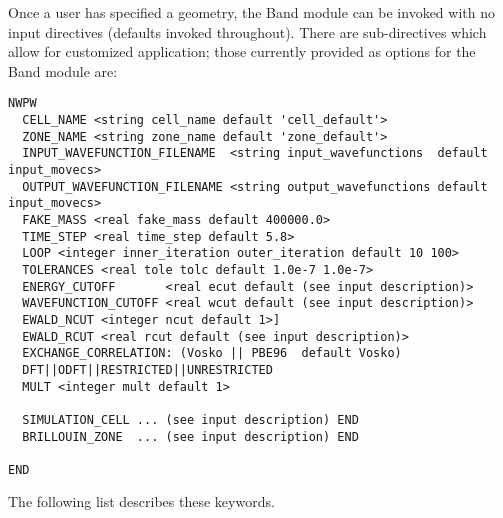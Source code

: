 Once a user has specified a geometry, the Band module can be invoked with no input directives (defaults invoked throughout).  There are sub-directives which allow for customized application; those currently provided as options for the Band module are:
\begin{verbatim}
NWPW
  CELL_NAME <string cell_name default 'cell_default'>
  ZONE_NAME <string zone_name default 'zone_default'>
  INPUT_WAVEFUNCTION_FILENAME  <string input_wavefunctions  default input_movecs>
  OUTPUT_WAVEFUNCTION_FILENAME <string output_wavefunctions default input_movecs>
  FAKE_MASS <real fake_mass default 400000.0>
  TIME_STEP <real time_step default 5.8>
  LOOP <integer inner_iteration outer_iteration default 10 100>
  TOLERANCES <real tole tolc default 1.0e-7 1.0e-7>
  ENERGY_CUTOFF       <real ecut default (see input description)>
  WAVEFUNCTION_CUTOFF <real wcut default (see input description)>
  EWALD_NCUT <integer ncut default 1>]
  EWALD_RCUT <real rcut default (see input description)>
  EXCHANGE_CORRELATION: (Vosko || PBE96  default Vosko)
  DFT||ODFT||RESTRICTED||UNRESTRICTED
  MULT <integer mult default 1>
  
  SIMULATION_CELL ... (see input description) END
  BRILLOUIN_ZONE  ... (see input description) END

END 
\end{verbatim}
The following list describes these keywords.

